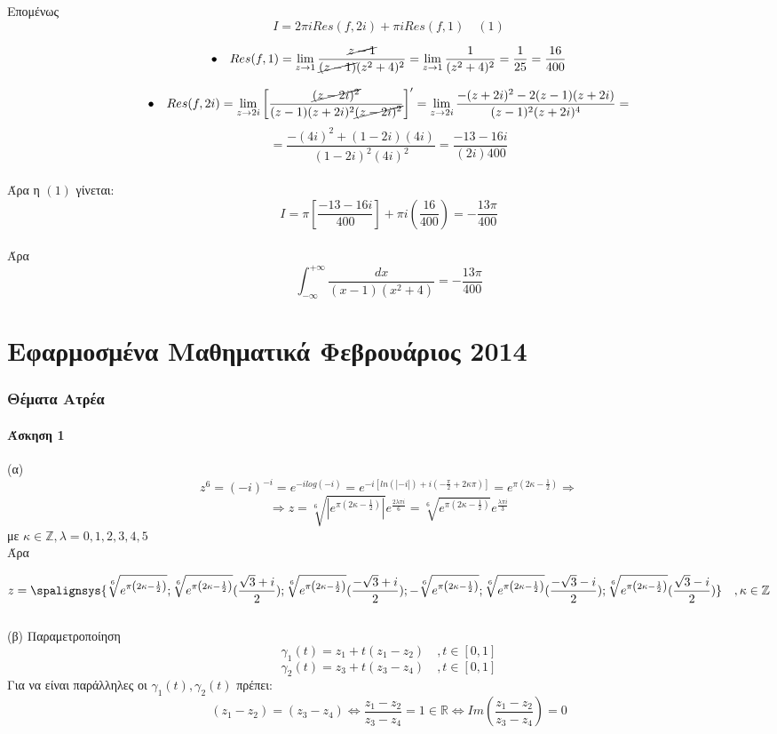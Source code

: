 \documentclass[12pt]{article}
\begin{document}
Επομένως $$ Ι= 2 \pi i Res(f,2i)+ \pi i Res(f,1)\quad (1) $$

$$\bullet \quad Res(f,1)=\lim_{z\to 1}\frac{\cancel{z-1}}{\cancel{(z-1)}(z^2+4)^2}=\lim_{z\to 1}\frac{1}{(z^2+4)^2}=\frac{1}{25}=\frac{16}{400}$$

$$\bullet \quad 
Res(f,2i)=\lim_{z\to 2i} \left[ \frac{\cancel{(z-2i)^2}}{(z-1)(z+2i)^2\cancel{(z-2i)^2}} \right]'= 
\lim_{z\to 2i} 
\frac{-(z+2i)^2-2(z-1)(z+2i)}{(z-1)^2(z+2i)^4}=
$$
$$=
\frac{-(4i)^2+(1-2i)(4i)}{(1-2i)^2(4i)^2}
=\frac{-13-16i}{(2i)400}
$$
\\
Άρα η $(1)$ γίνεται:
\\
$$ Ι=\pi  \left[ \frac{-13-16i}{400} \right] + \pi i \left( \frac{16}{400} \right) = 
-\frac{13\pi}{400}
$$
\\
Άρα $$ \int_{-\infty}^{+\infty} \frac{dx}{(x-1)(x^2+4)}= -\frac{13\pi}{400} $$

 

\newpage \part{Εφαρμοσμένα Μαθηματικά Φεβρουάριος 2014}
\author{}
  

\maketitle
\newpage
 

 \section{Θέματα Ατρέα}
 \subsection{Άσκηση 1}
(α) $$z^6=(-i)^{-i}=e^{-ilog(-i)}=e^{-i[ln(|-i|)+i(-\frac{\pi}{2}+2 \kappa \pi)]}=e^{\pi\left(2\kappa -\frac{1}{2}\right)}\Rightarrow
$$
$$\Rightarrow
z=\sqrt[6]{|e^{\pi\left(2\kappa -\frac{1}{2}\right)}|}e^{\frac{2\lambda\pi i}{6}}
=\sqrt[6]{e^{\pi\left(2\kappa -\frac{1}{2}\right)}}e^{\frac{\lambda\pi i}{3}}$$
με $\kappa\in \mathbb{Z},\lambda={0,1,2,3,4,5}$ 
\\
Άρα

\[
z= 
\spalignsys{
\sqrt[6]{e^{\pi\left(2\kappa -\frac{1}{2}\right)}};
\sqrt[6]{e^{\pi\left(2\kappa -\frac{1}{2}\right)}} ( \frac{\sqrt{3}+i}{2} );
\sqrt[6]{e^{\pi\left(2\kappa -\frac{1}{2}\right)}} ( \frac{-\sqrt{3}+i}{2} );
-\sqrt[6]{e^{\pi\left(2\kappa -\frac{1}{2}\right)}} ;
\sqrt[6]{e^{\pi\left(2\kappa -\frac{1}{2}\right)}} ( \frac{-\sqrt{3}-i}{2} );
\sqrt[6]{e^{\pi\left(2\kappa -\frac{1}{2}\right)}} ( \frac{\sqrt{3}-i}{2} )
 }
 \quad,\kappa \in \mathbb{Z}
\]
\\
(β) Παραμετροποίηση
$$ \gamma_1(t)=z_1+t(z_1-z_2) \quad ,t\in[0,1]$$
$$ \gamma_2(t)=z_3+t(z_3-z_4) \quad ,t\in[0,1]$$
Για να είναι παράλληλες οι $ \gamma_1(t),\gamma_2(t)$ πρέπει:
$$ (z_1-z_2)= (z_3-z_4) \Leftrightarrow \frac{z_1-z_2}{z_3-z_4}=1\in\mathbb{R}
  \Leftrightarrow Im \left(\frac{z_1-z_2}{z_3-z_4}\right)=0 $$
\newpage
\end{document}
